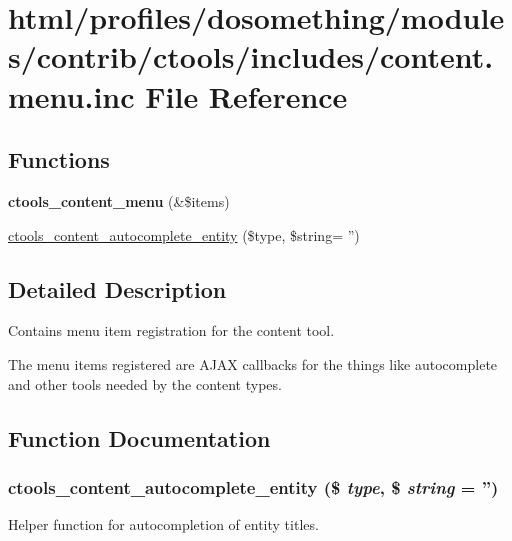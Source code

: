 \hypertarget{content_8menu_8inc}{
\section{html/profiles/dosomething/modules/contrib/ctools/includes/content.menu.inc File Reference}
\label{content_8menu_8inc}
}
\subsection*{Functions}
\begin{DoxyCompactItemize}
\item 
\hypertarget{content_8menu_8inc_ad3c75d3e25a017b1b4c4cc37c19bbc7e}{
{\bfseries ctools\_\-content\_\-menu} (\&\$items)}
\label{content_8menu_8inc_ad3c75d3e25a017b1b4c4cc37c19bbc7e}

\item 
\hyperlink{content_8menu_8inc_aced77b01776a4fc305ea56ab0e919d31}{ctools\_\-content\_\-autocomplete\_\-entity} (\$type, \$string= '')
\end{DoxyCompactItemize}


\subsection{Detailed Description}
Contains menu item registration for the content tool.

The menu items registered are AJAX callbacks for the things like autocomplete and other tools needed by the content types. 

\subsection{Function Documentation}
\hypertarget{content_8menu_8inc_aced77b01776a4fc305ea56ab0e919d31}{
\subsubsection[{ctools\_\-content\_\-autocomplete\_\-entity}]{\setlength{\rightskip}{0pt plus 5cm}ctools\_\-content\_\-autocomplete\_\-entity (\$ {\em type}, \/  \$ {\em string} = {\ttfamily ''})}}
\label{content_8menu_8inc_aced77b01776a4fc305ea56ab0e919d31}
Helper function for autocompletion of entity titles. 
